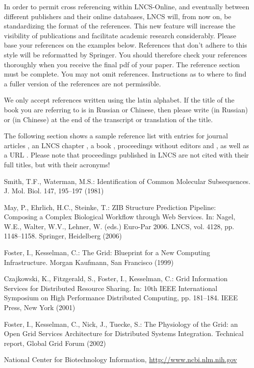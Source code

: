 \documentclass[runningheads,a4paper]{llncs}
\begin{document}
In order to permit cross referencing within LNCS-Online, and eventually
between different publishers and their online databases, LNCS will,
from now on, be standardizing the format of the references. This new
feature will increase the visibility of publications and facilitate
academic research considerably. Please base your references on the
examples below. References that don't adhere to this style will be
reformatted by Springer. You should therefore check your references
thoroughly when you receive the final pdf of your paper.
The reference section must be complete. You may not omit references.
Instructions as to where to find a fuller version of the references are
not permissible.

We only accept references written using the latin alphabet. If the title
of the book you are referring to is in Russian or Chinese, then please write
(in Russian) or (in Chinese) at the end of the transcript or translation
of the title.

The following section shows a sample reference list with entries for
journal articles \cite{jour}, an LNCS chapter \cite{lncschap}, a book
\cite{book}, proceedings without editors \cite{proceeding1} and
\cite{proceeding2}, as well as a URL \cite{url}.
Please note that proceedings published in LNCS are not cited with their
full titles, but with their acronyms!

\begin{thebibliography}{4}

 Smith, T.F., Waterman, M.S.: Identification of Common Molecular
Subsequences. J. Mol. Biol. 147, 195--197 (1981)

 May, P., Ehrlich, H.C., Steinke, T.: ZIB Structure Prediction Pipeline:
Composing a Complex Biological Workflow through Web Services. In: Nagel,
W.E., Walter, W.V., Lehner, W. (eds.) Euro-Par 2006. LNCS, vol. 4128,
pp. 1148--1158. Springer, Heidelberg (2006)

 Foster, I., Kesselman, C.: The Grid: Blueprint for a New Computing
Infrastructure. Morgan Kaufmann, San Francisco (1999)

 Czajkowski, K., Fitzgerald, S., Foster, I., Kesselman, C.: Grid
Information Services for Distributed Resource Sharing. In: 10th IEEE
International Symposium on High Performance Distributed Computing, pp.
181--184. IEEE Press, New York (2001)

 Foster, I., Kesselman, C., Nick, J., Tuecke, S.: The Physiology of the
Grid: an Open Grid Services Architecture for Distributed Systems
Integration. Technical report, Global Grid Forum (2002)

 National Center for Biotechnology Information, \url{http://www.ncbi.nlm.nih.gov}

\end{thebibliography}
\end{document}
